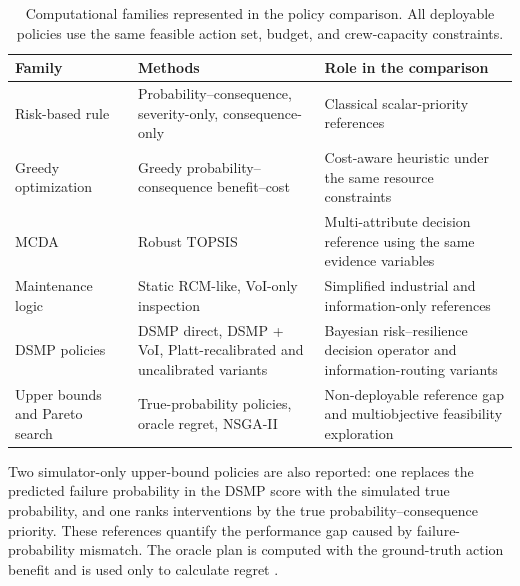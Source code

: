 \documentclass[cmes,article,submit,moreauthors,pdftex]{Definitions/tsp}
\begin{document}
\begin{table}[H]
\centering
\scriptsize
\caption{Computational families represented in the policy comparison. All deployable policies use the same feasible action set, budget, and crew-capacity constraints.}
\label{tab:baseline-families}
\begin{tabular*}{\textwidth}{@{\extracolsep{\fill}}>{\raggedright\arraybackslash}p{}>{\raggedright\arraybackslash}p{}>{\raggedright\arraybackslash}p{}}
\toprule
Family & Methods & Role in the comparison \\
\midrule
Risk-based rule & Probability--consequence, severity-only, consequence-only & Classical scalar-priority references \\
Greedy optimization & Greedy probability--consequence benefit--cost & Cost-aware heuristic under the same resource constraints \\
MCDA & Robust TOPSIS & Multi-attribute decision reference using the same evidence variables \\
Maintenance logic & Static RCM-like, VoI-only inspection & Simplified industrial and information-only references \\
DSMP policies & DSMP direct, DSMP + VoI, Platt-recalibrated and uncalibrated variants & Bayesian risk--resilience decision operator and information-routing variants \\
Upper bounds and Pareto search & True-probability policies, oracle regret, NSGA-II & Non-deployable reference gap and multiobjective feasibility exploration \\
\bottomrule
\end{tabular*}
\end{table}

Two simulator-only upper-bound policies are also reported: one replaces the predicted failure probability in the DSMP score with the simulated true probability, and one ranks interventions by the true probability--consequence priority. These references quantify the performance gap caused by failure-probability mismatch. The oracle plan is computed with the ground-truth action benefit and is used only to calculate regret \cite{papakonstantinou2014a,andriotis2019,dejonge2020}.
\end{document}
